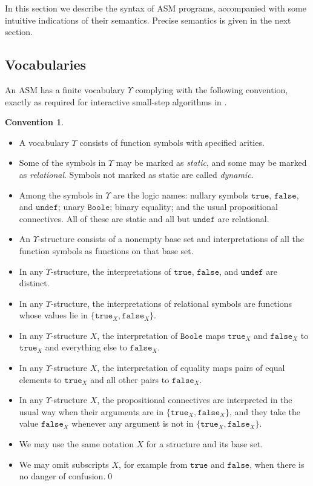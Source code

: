\documentclass{LMCS}
\theoremstyle{definition}
\newtheorem{conn}[thm]{Convention}
\newenvironment{ls}{\begin{itemize}}{\end{itemize}}
\newcommand{\U}{\Upsilon}
\newcommand{\ttt}[1]{\ensuremath{\mathtt {#1}}}
\begin{document}
In this section we describe the syntax of ASM programs, accompanied
with some intuitive indications of their semantics.  Precise semantics
is given in the next section.

\subsection{Vocabularies}

An ASM has a finite vocabulary $\U$ complying with the following
convention, exactly as required for interactive small-step algorithms
in \cite{ga1}.

\begin{conn}   \label{vocab}
\mbox{}
  \begin{ls}
    \item A vocabulary $\U$ consists of function symbols with
    specified arities.
    \item Some of the symbols in $\U$ may be marked as
    \emph{static}, and some may be marked as \emph{relational}.
    Symbols not marked as static are called \emph{dynamic}.
    \item Among the symbols in $\U$ are the logic names: nullary
    symbols \ttt{true}, \ttt{false}, and \ttt{undef}; unary
    \ttt{Boole}; binary equality; and the usual propositional
    connectives.  All of these are static and all but \ttt{undef} are
    relational.
    \item An $\Upsilon$-structure consists of a nonempty base set and
      interpretations of all the function symbols as functions  on
      that base set.
    \item In any $\U$-structure, the interpretations of \ttt{true},
    \ttt{false}, and \ttt{undef} are distinct.
    \item In any $\U$-structure, the interpretations of relational
    symbols are functions whose values lie in
    $\{\ttt{true}_X,\ttt{false}_X\}$.
  \item In any $\U$-structure $X$, the interpretation of
    \ttt{Boole} maps $\ttt{true}_X$ and $\ttt{false}_X$ to
    $\ttt{true}_X$ and everything else to $\ttt{false}_X$.
    \item In any $\U$-structure $X$, the interpretation of
    equality maps pairs of equal elements to $\ttt{true}_X$ and all
    other pairs to $\ttt{false}_X$.
    \item In any $\U$-structure $X$, the propositional connectives
    are interpreted in the usual way when their arguments are in
    $\{\ttt{true}_X,\ttt{false}_X\}$, and they take the value
    $\ttt{false}_X$ whenever any argument is not in
    $\{\ttt{true}_X,\ttt{false}_X\}$.
    \item We may use the same notation $X$ for a structure and its
    base set.
\item We may omit subscripts $X$, for example from \ttt{true} and
  \ttt{false}, when there is no danger of confusion.\qed
  \end{ls}
\end{conn}
\end{document}
